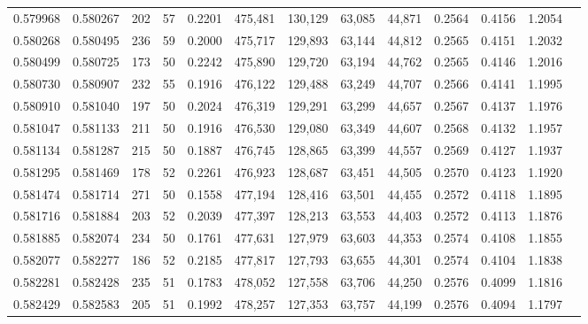 \begin{tabular}{rrrrrrrrrrrrr}
0.579968 & 0.580267 &   202 &  57 &                                     0.2201 & 475,481 & 130,129 &  63,085 &  44,871 & 0.2564 & 0.4156 & 1.2054 \\
0.580268 & 0.580495 &   236 &  59 &                                     0.2000 & 475,717 & 129,893 &  63,144 &  44,812 & 0.2565 & 0.4151 & 1.2032 \\
0.580499 & 0.580725 &   173 &  50 &                                     0.2242 & 475,890 & 129,720 &  63,194 &  44,762 & 0.2565 & 0.4146 & 1.2016 \\
0.580730 & 0.580907 &   232 &  55 &                                     0.1916 & 476,122 & 129,488 &  63,249 &  44,707 & 0.2566 & 0.4141 & 1.1995 \\
0.580910 & 0.581040 &   197 &  50 &                                     0.2024 & 476,319 & 129,291 &  63,299 &  44,657 & 0.2567 & 0.4137 & 1.1976 \\
0.581047 & 0.581133 &   211 &  50 &                                     0.1916 & 476,530 & 129,080 &  63,349 &  44,607 & 0.2568 & 0.4132 & 1.1957 \\
0.581134 & 0.581287 &   215 &  50 &                                     0.1887 & 476,745 & 128,865 &  63,399 &  44,557 & 0.2569 & 0.4127 & 1.1937 \\
0.581295 & 0.581469 &   178 &  52 &                                     0.2261 & 476,923 & 128,687 &  63,451 &  44,505 & 0.2570 & 0.4123 & 1.1920 \\
0.581474 & 0.581714 &   271 &  50 &                                     0.1558 & 477,194 & 128,416 &  63,501 &  44,455 & 0.2572 & 0.4118 & 1.1895 \\
0.581716 & 0.581884 &   203 &  52 &                                     0.2039 & 477,397 & 128,213 &  63,553 &  44,403 & 0.2572 & 0.4113 & 1.1876 \\
0.581885 & 0.582074 &   234 &  50 &                                     0.1761 & 477,631 & 127,979 &  63,603 &  44,353 & 0.2574 & 0.4108 & 1.1855 \\
0.582077 & 0.582277 &   186 &  52 &                                     0.2185 & 477,817 & 127,793 &  63,655 &  44,301 & 0.2574 & 0.4104 & 1.1838 \\
0.582281 & 0.582428 &   235 &  51 &                                     0.1783 & 478,052 & 127,558 &  63,706 &  44,250 & 0.2576 & 0.4099 & 1.1816 \\
0.582429 & 0.582583 &   205 &  51 &                                     0.1992 & 478,257 & 127,353 &  63,757 &  44,199 & 0.2576 & 0.4094 & 1.1797 \\

\end{tabular}
